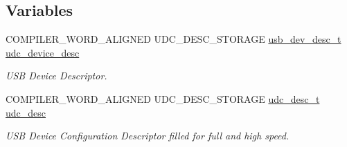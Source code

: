 \subsection*{\-Variables}
\begin{DoxyCompactItemize}
\item 
\-C\-O\-M\-P\-I\-L\-E\-R\-\_\-\-W\-O\-R\-D\-\_\-\-A\-L\-I\-G\-N\-E\-D \*
\-U\-D\-C\-\_\-\-D\-E\-S\-C\-\_\-\-S\-T\-O\-R\-A\-G\-E \*
\hyperlink{structusb__dev__desc__t}{usb\-\_\-dev\-\_\-desc\-\_\-t} \hyperlink{group__udi__cdc__group__desc_ga9b0e293c7d3236bf90c42d808c2bc1ab}{udc\-\_\-device\-\_\-desc}
\begin{DoxyCompactList}\small\item\em \-U\-S\-B \-Device \-Descriptor. \end{DoxyCompactList}\item 
\-C\-O\-M\-P\-I\-L\-E\-R\-\_\-\-W\-O\-R\-D\-\_\-\-A\-L\-I\-G\-N\-E\-D \*
\-U\-D\-C\-\_\-\-D\-E\-S\-C\-\_\-\-S\-T\-O\-R\-A\-G\-E \hyperlink{structudc__desc__t}{udc\-\_\-desc\-\_\-t} \hyperlink{group__udi__cdc__group__desc_ga786079ecd77f4d55ac99cc5f49e0fde7}{udc\-\_\-desc}
\begin{DoxyCompactList}\small\item\em \-U\-S\-B \-Device \-Configuration \-Descriptor filled for full and high speed. \end{DoxyCompactList}\end{DoxyCompactItemize}
